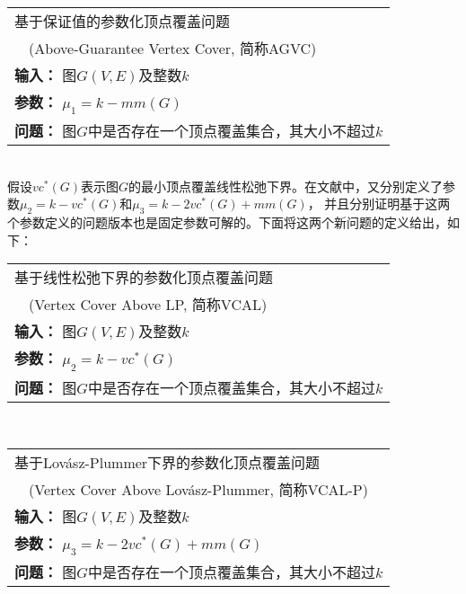\begin{tabular}{| p{0.9\headwidth} |}
  \hline
  基于保证值的参数化顶点覆盖问题 \\ \ \ (Above-Guarantee Vertex Cover, 简称AGVC) \\
  \textbf{输入：} 图$G(V, E)$及整数$k$ \\
  \textbf{参数：} $\mu_1 = k - mm(G)$\\
  \textbf{问题：} 图$G$中是否存在一个顶点覆盖集合，其大小不超过$k$\\
  \hline
\end{tabular} \vspace{0.5cm} \\
假设$vc^*(G)$表示图$G$的最小顶点覆盖线性松弛下界。在文献\cite{narayanaswamy2012lp, garg2015raising}中，又分别定义了参数$\mu_2 = k - vc^*(G)$和$\mu_3 = k - 2vc^*(G) + mm(G)$，
并且分别证明基于这两个参数定义的问题版本也是固定参数可解的。下面将这两个新问题的定义给出，如下： \\

\begin{tabular}{| p{0.9\headwidth} |}
  \hline
  基于线性松弛下界的参数化顶点覆盖问题 \\ \ \ (Vertex Cover Above LP, 简称VCAL) \\
  \textbf{输入：} 图$G(V, E)$及整数$k$ \\
  \textbf{参数：} $\mu_2 = k - vc^*(G)$\\
  \textbf{问题：} 图$G$中是否存在一个顶点覆盖集合，其大小不超过$k$\\
  \hline
\end{tabular} \vspace{0.5cm} \\

\begin{tabular}{| p{0.9\headwidth} |}
  \hline
  基于Lov\'asz-Plummer下界的参数化顶点覆盖问题 \\ \ \ (Vertex Cover Above Lov\'asz-Plummer, 简称VCAL-P) \\
  \textbf{输入：} 图$G(V, E)$及整数$k$ \\
  \textbf{参数：} $\mu_3 = k - 2vc^*(G) + mm(G)$\\
  \textbf{问题：} 图$G$中是否存在一个顶点覆盖集合，其大小不超过$k$\\
  \hline
\end{tabular} \vspace{0.5cm} \\

